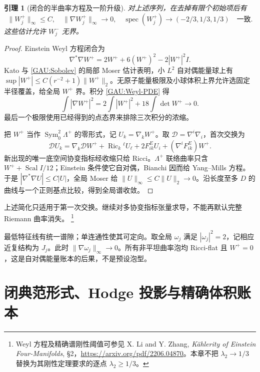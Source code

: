 \documentclass[UTF8,fontset=fandol,zihao=-4,oneside,openany]{ctexbook}
\theoremstyle{cjkplain}
\newtheorem{lemma}[theorem]{引理}
\numberwithin{equation}{chapter}
\begin{document}
\begin{lemma}[闭合的半曲率方程及一阶升级]\label{GAU:first-derivative}
对上述序列，在去掉有限个初始项后有
\[
\|W_j^+\|_\infty\le C,\quad
\|\nabla W_j^+\|_\infty\to0,\quad
\operatorname{spec}(W_j^+)\to(-2/3,1/3,1/3)\quad\text{一致}.
\]
这些估计允许 $W_j^-$ 无界。
\end{lemma}
\begin{proof}
Einstein Weyl 方程闭合为
\begin{equation}\label{GAU:Weyl-PDE}
\nabla^*\nabla W^+=2W^++6(W^+)^2-2|W^+|^2I.
\end{equation}
Kato 与 \eqref{GAU:Sobolev} 的局部 Moser 估计表明，小 $L^2$ 自对偶能量球上有 $\sup|W^+|\le C(r^{-2}+1)\|W^+\|_2$。无原子能量极限及小球体积上界允许选固定半径覆盖，给全局 $W^+$ 界。积分 \eqref{GAU:Weyl-PDE} 得
\[
\int|\nabla W^+|^2=2\int|W^+|^2+18\int\det W^+\to0.
\]
最后一个极限使用已经得到的点态界来排除三次积分的浓缩。

把 $W^+$ 当作 $\operatorname{Sym}^2_0\Lambda^+$ 的零形式，记 $U_k=\nabla_kW^+$。取 $\mathcal D=\nabla^i\nabla_i$，首次交换为
\begin{equation}\label{GAU:commutator}
\mathcal D U_k=\nabla_k\mathcal D W^+
+\operatorname{Ric}_k{}^\ell U_\ell
+2F^E_{ik}U_i+(\nabla^iF^E_{ik})W^+.
\end{equation}
新出现的唯一底空间协变指标经收缩只给 Ricci。$\Lambda^+$ 联络曲率只含 $W^++\operatorname{Scal}I/12$；Einstein 条件使它自对偶，Bianchi 因而给 Yang--Mills 方程。于是 $|\nabla^*\nabla U|\le C|U|$，全局 Moser 给 $\|U\|_\infty\le C\|U\|_2\to0$。沿长度至多 $D$ 的曲线与一个正则基点比较，得到全局谱收敛。
\end{proof}

上述简化只适用于第一次交换。继续对多协变指标张量求导，不能再默认完整 Riemann 曲率消失。
\footnote{Weyl 方程及精确谱刚性阈值可参见 X. Li and Y. Zhang, \emph{Kählerity of Einstein Four-Manifolds}, §2，\url{https://arxiv.org/pdf/2206.04870}。本章不把 $\lambda_2\to1/3$ 替换为其刚性定理要求的逐点 $\lambda_2\ge1/3$。}

最低特征线有统一谱隙；单连通性使其可定向。取全局 $\omega_j$ 满足 $|\omega_j|^2=2$，记相应近复结构为 $J_j$。此时 $\|\nabla\omega_j\|_\infty\to0$。所有非平坦曲率泡均 Ricci-flat 且 $W^+=0$，这是自对偶能量账本的后果，不是预设泡型。

\section{闭典范形式、Hodge 投影与精确体积账本}
\label{GAU:AK}
\end{document}
